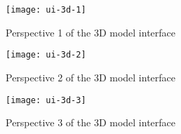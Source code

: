 \begin{figure}[!htb]
    \minipage{\textwidth}
    \texttt{[image: ui-3d-1]}
    \caption{Perspective 1 of the 3D model interface}\label{fig:ui-3d-1}
    \endminipage
\end{figure}

\begin{figure}[!htb]
    \minipage{\textwidth}
    \texttt{[image: ui-3d-2]}
    \caption{Perspective 2 of the 3D model interface}\label{fig:ui-3d-2}
    \endminipage
\end{figure}

\begin{figure}[!htb]
    \minipage{\textwidth}
    \texttt{[image: ui-3d-3]}
    \caption{Perspective 3 of the 3D model interface}\label{fig:ui-3d-3}
    \endminipage
\end{figure}